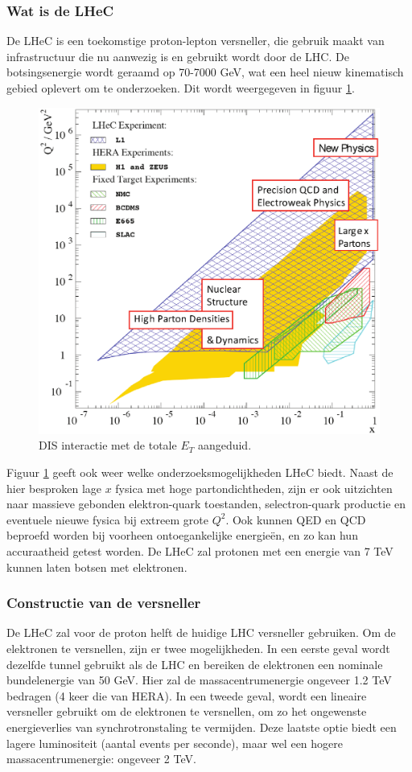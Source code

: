 \documentclass[a4paper,11pt]{article}
\numberwithin{equation}{section} %
\begin{document}
    \subsubsection{Wat is de LHeC}
De LHeC is een toekomstige proton-lepton versneller, die gebruik maakt van infrastructuur die nu aanwezig is en gebruikt wordt door de LHC.
De botsingsenergie wordt geraamd op 70-7000 GeV, wat een heel nieuw kinematisch gebied oplevert om te onderzoeken.
Dit wordt weergegeven in figuur \ref{fig:LHeCKinematicRegion}.
\begin{figure} [H]
  \begin{center}
    \includegraphics[width=.66\textwidth]{Afbeeldingen/LHeCKinematicRegion.eps}
    \caption{DIS interactie met de totale $E_T$ aangeduid. \cite{ET}}
   \label{fig:LHeCKinematicRegion}
  \end{center}
\end{figure}
Figuur \ref{fig:LHeCKinematicRegion} geeft ook weer welke onderzoeksmogelijkheden LHeC biedt.
Naast de hier besproken lage $x$ fysica met hoge partondichtheden, zijn er ook uitzichten naar massieve gebonden elektron-quark toestanden, selectron-quark productie en eventuele nieuwe fysica bij extreem grote $Q^2$.
Ook kunnen QED en QCD beproefd worden bij voorheen ontoegankelijke energieën, en zo kan hun accuraatheid getest worden.
De LHeC zal protonen met een energie van 7 TeV kunnen laten botsen met elektronen.

    \subsubsection{Constructie van de  versneller}
De LHeC zal voor de proton helft de huidige LHC versneller gebruiken.
Om de elektronen te versnellen, zijn er twee mogelijkheden.
In een eerste geval wordt dezelfde tunnel gebruikt als de LHC en bereiken de elektronen een nominale bundelenergie van 50 GeV.
Hier zal de massacentrumenergie ongeveer 1.2 TeV bedragen (4 keer die van HERA).
In een tweede geval, wordt een lineaire versneller gebruikt om de elektronen te versnellen, om zo het ongewenste energieverlies van synchrotronstaling te vermijden.
Deze laatste optie biedt een lagere luminositeit (aantal events per seconde), maar wel een hogere massacentrumenergie: ongeveer 2 TeV.
\end{document}
